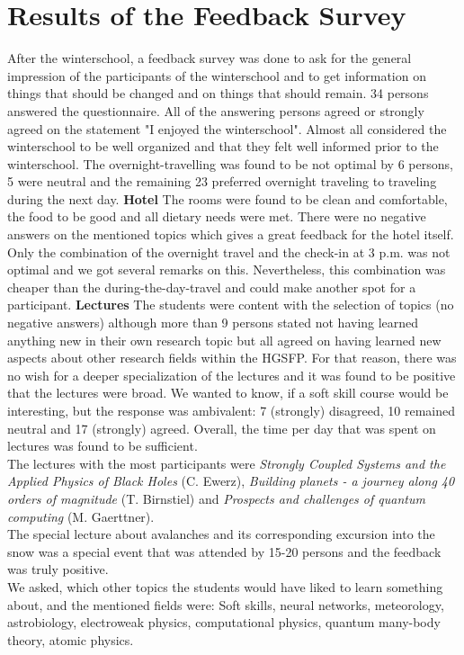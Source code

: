 \section*{Results of the Feedback Survey}
After the winterschool, a feedback survey was done to ask for the general impression of the participants of the winterschool and to get information on things that should be changed and on things that should remain. 34 persons answered the questionnaire. All of the answering persons agreed or strongly agreed on the statement "I enjoyed the winterschool". Almost all considered the winterschool to be well organized and that they felt well informed prior to the winterschool. The overnight-travelling was found to be not optimal by 6 persons, 5 were neutral and the remaining 23 preferred overnight traveling to traveling during the next day. 
\textbf{Hotel}
The rooms were found to be clean and comfortable, the food to be good and all dietary needs were met. There were no negative answers on the mentioned topics which gives a great feedback for the hotel itself. Only the combination of the overnight travel and the check-in at 3 p.m. was not optimal and we got several remarks on this. Nevertheless, this combination was cheaper than the during-the-day-travel and could make another spot for a participant.
\textbf{Lectures}
The students were content with the selection of topics (no negative answers) although more than 9 persons stated not having learned anything new in their own research topic but all agreed on having learned new aspects about other research fields within the HGSFP. For that reason, there was no wish for a deeper specialization of the lectures and it was found to be positive that the lectures were broad. We wanted to know, if a soft skill course would be interesting, but the response was ambivalent: 7 (strongly) disagreed, 10 remained neutral and 17 (strongly) agreed. Overall, the time per day that was spent on lectures was found to be sufficient.\\
The lectures with the most participants were \textit{Strongly Coupled Systems and the Applied Physics of Black Holes} (C. Ewerz), \textit{Building planets - a journey along 40 orders of magnitude} (T. Birnstiel) and \textit{Prospects and challenges of quantum computing} (M. Gaerttner).\\
The special lecture about avalanches and its corresponding excursion into the snow was a special event that was attended by 15-20 persons and the feedback was truly positive.\\
We asked, which other topics the students would have liked to learn something about, and the mentioned fields were: Soft skills, neural networks, meteorology, astrobiology, electroweak physics, computational physics, quantum many-body theory, atomic physics. 
